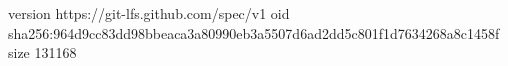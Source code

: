 version https://git-lfs.github.com/spec/v1
oid sha256:964d9cc83dd98bbeaca3a80990eb3a5507d6ad2dd5c801f1d7634268a8c1458f
size 131168
